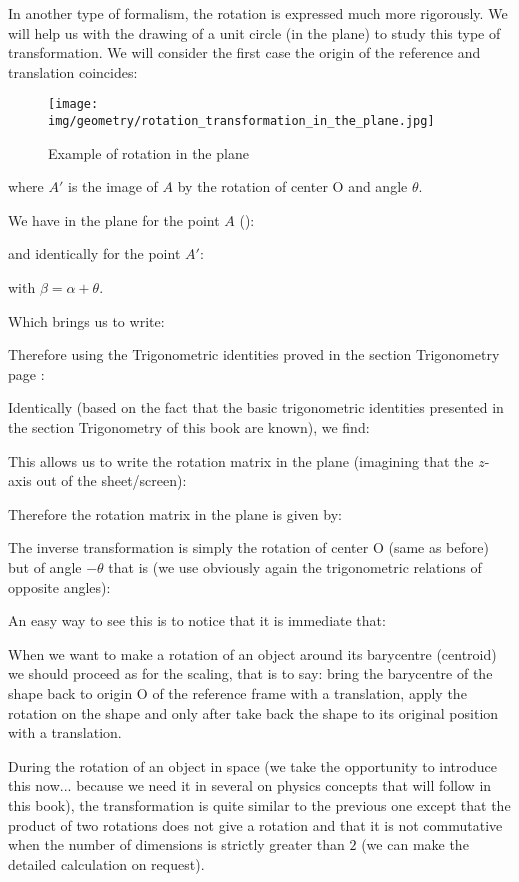 	In another type of formalism, the rotation is expressed much more rigorously. We will help us with the drawing of a unit circle (in the plane) to study this type of transformation. We will consider the first case the origin of the reference and translation coincides: 
	\begin{figure}[H]
		\centering
		\texttt{[image: img/geometry/rotation\_transformation\_in\_the\_plane.jpg]}
		\caption{Example of rotation in the plane}
	\end{figure}
	where $A'$ is the image of $A$ by the rotation of center O and angle $\theta$.

	We have in the plane for the point $A$ ():
	
	and identically for the point $A'$:
	
	with $\beta=\alpha+\theta$.

	Which brings us to write:
	
	Therefore using the Trigonometric identities proved in the section Trigonometry page \pageref{remarkable trigonometric identities}:
	
	Identically (based on the fact that the basic trigonometric identities presented in the section Trigonometry of this book are known), we find:
	
	This allows us to write the rotation matrix in the plane (imagining that the $z$-axis out of the sheet/screen)\label{rotation matrix in the plane}:
	
	Therefore the rotation matrix in the plane is given by:
	
	The inverse transformation is simply the rotation of center O (same as before) but of angle $-\theta$ that is (we use obviously again the trigonometric relations of opposite angles):
	
	An easy way to see this is to notice that it is immediate that:
	
	When we want to make a rotation of an object around its barycentre (centroid) we should proceed as for the scaling, that is to say: bring the barycentre of the shape back to origin O of the reference frame with a translation, apply the rotation on the shape and only after take back the shape to its original position with a translation.
	
	\label{3d rotation matrix around}During the rotation of an object in space (we take the opportunity to introduce this now... because we need it in several on physics concepts that will follow in this book), the transformation is quite similar to the previous one except that the product of two rotations does not give a rotation and that it is not commutative when the number of dimensions is strictly greater than $2$ (we can make the detailed calculation on request).
	
